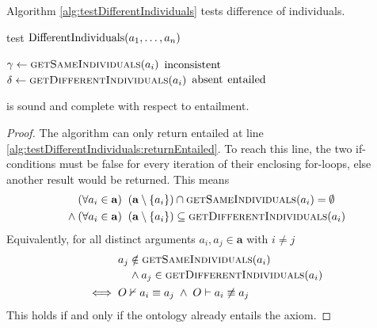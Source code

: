 \documentclass[paper.tex]{subfiles}
\begin{document}
Algorithm \ref{alg:testDifferentIndividuals} tests difference of individuals.

\begin{algorithm}[H]
  \caption{test $\mathrm{DifferentIndividuals}(a_1, \ldots, a_n)$}
  \label{alg:testDifferentIndividuals}
  \begin{algorithmic}[1]
    \raggedright
        \State $\gamma \gets \Call{getSameIndividuals}{a_i}$
          \State \Return $\mathrm{inconsistent}$
          \label{alg:testDifferentIndividuals:returnInconsistent}
        \EndIf
      \EndFor
        \State $\delta \gets \Call{getDifferentIndividuals}{a_i}$
          \State \Return $\mathrm{absent}$
        \EndIf
      \EndFor
      \State \Return $\mathrm{entailed}$
      \label{alg:testDifferentIndividuals:returnEntailed}
    \EndFunction
  \end{algorithmic}
\end{algorithm}

\begin{proposition}
  \sloppy
   is sound and complete with respect to entailment.
\end{proposition}
\begin{proof}
  The algorithm can only return entailed at line \ref{alg:testDifferentIndividuals:returnEntailed}.  To reach this line, the two if-conditions must be false for every iteration of their enclosing for-loops, else another result would be returned.  This means
  \begin{align*}
    & (\forall a_i \in \mathbf{a}) \;\; (\mathbf{a} \setminus \{a_i\}) \intersect \Call{getSameIndividuals}{a_i} = \emptyset \\
    {}\land{}& (\forall a_i \in \mathbf{a}) \;\; (\mathbf{a} \setminus \{a_i\}) \subseteq \Call{getDifferentIndividuals}{a_i}
  \end{align*}
  Equivalently, for all distinct arguments $a_i, a_j \in \mathbf{a}$ with $i \ne j$
  \begin{align*}
    & \begin{multlined}[t]
      a_j \notin \Call{getSameIndividuals}{a_i} \\
      {} \land a_j \in \Call{getDifferentIndividuals}{a_i}
    \end{multlined} \\
    \iff{}& O \nsementails a_i \equiv a_j \;\land\; O \sementails a_i \not\equiv a_j
  \end{align*}
  This holds if and only if the ontology already entails the axiom.
\end{proof}
\end{document}
